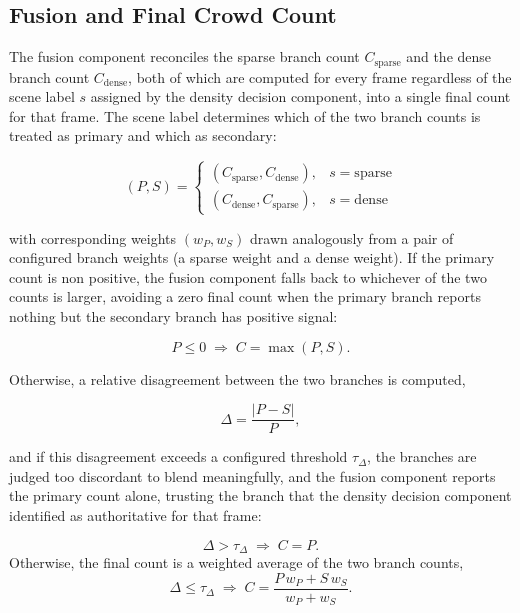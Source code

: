 \documentclass[12pt,a4paper]{report}
\begin{document}
\subsection{Fusion and Final Crowd Count}
\label{sec:fusion}

The fusion component reconciles the sparse branch count $C_{\text{sparse}}$ and the dense branch count $C_{\text{dense}}$, both of which are computed for every frame regardless of the scene label $s$ assigned by the density decision component, into a single final count for that frame. The scene label determines which of the two branch counts is treated as primary and which as secondary:

\begin{equation}
	(P,S) =
	\begin{cases}
		(C_{\text{sparse}}, C_{\text{dense}}), & s = \text{sparse} \\
		(C_{\text{dense}}, C_{\text{sparse}}), & s = \text{dense}
	\end{cases}
\end{equation}

with corresponding weights $(w_P,w_S)$ drawn analogously from a pair of configured branch weights (a sparse weight and a dense weight). If the primary count is non positive, the fusion component falls back to whichever of the two counts is larger, avoiding a zero final count when the primary branch reports nothing but the secondary branch has positive signal:

\begin{equation}
	P \le 0 \;\Rightarrow\; C = \max(P,S).
\end{equation}

Otherwise, a relative disagreement between the two branches is computed,

\begin{equation}
	\Delta = \frac{|P-S|}{P},
\end{equation}

and if this disagreement exceeds a configured threshold $\tau_{\Delta}$, the branches are judged too discordant to blend meaningfully, and the fusion component reports the primary count alone, trusting the branch that the density decision component identified as authoritative for that frame:

\begin{equation}
	\Delta > \tau_{\Delta} \;\Rightarrow\; C = P.
\end{equation}
Otherwise, the final count is a weighted average of the two branch counts,
\begin{equation}
	\Delta \le \tau_{\Delta} \;\Rightarrow\; C = \frac{P\,w_P + S\,w_S}{w_P + w_S}.
\end{equation}
\end{document}
